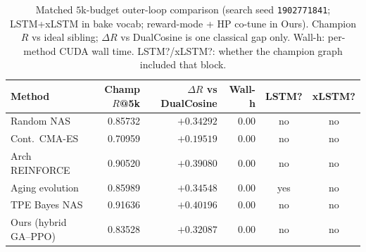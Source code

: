 \begin{table}[t]
  \centering
  \caption{Matched $5$k-budget outer-loop comparison (search seed \texttt{1902771841}; LSTM+xLSTM in bake vocab; reward-mode + HP co-tune in Ours). Champion $R$ vs ideal sibling; $\Delta R$ vs DualCosine is one classical gap only. Wall-h: per-method CUDA wall time. LSTM?/xLSTM?: whether the champion graph included that block.}
  \label{tab:meta-approaches}
  \setlength{\tabcolsep}{3pt}
  \small
  \begin{tabular}{@{}lrrrcc@{}}
    \toprule
    Method & Champ $R$@5k & $\Delta R$ vs DualCosine & Wall-h & LSTM? & xLSTM? \\
    \midrule
    Random NAS & 0.85732 & $+0.34292$ & 0.00 & no & no \\
    Cont.\ CMA-ES & 0.70959 & $+0.19519$ & 0.00 & no & no \\
    Arch REINFORCE & 0.90520 & $+0.39080$ & 0.00 & no & no \\
    Aging evolution & 0.85989 & $+0.34548$ & 0.00 & yes & no \\
    TPE Bayes NAS & 0.91636 & $+0.40196$ & 0.00 & no & no \\
    Ours (hybrid GA--PPO) & 0.83528 & $+0.32087$ & 0.00 & no & no \\
    \bottomrule
  \end{tabular}
\end{table}
